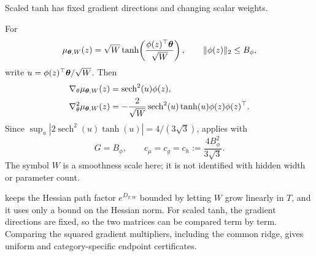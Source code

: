 Scaled tanh has fixed gradient directions and changing scalar weights.

\begin{remark}
For
\[
 \mu_{\boldsymbol{\theta},W}(z)=\sqrt W\tanh\!\left(
 \frac{\phi(z)^\top\boldsymbol{\theta}}{\sqrt W}\right),
 \qquad \|\phi(z)\|_2\le B_\phi,
\]
write $u=\phi(z)^\top\boldsymbol{\theta}/\sqrt W$.  Then
\begin{align*}
 \nabla_\theta\mu_{\boldsymbol{\theta},W}(z)
 &=\operatorname{sech}^2(u)\phi(z),\\
 \nabla_\theta^2\mu_{\boldsymbol{\theta},W}(z)
 &=-\frac{2}{\sqrt W}\operatorname{sech}^2(u)\tanh(u)
 \phi(z)\phi(z)^\top.
\end{align*}
Since
$\sup_u|2\operatorname{sech}^2(u)\tanh(u)|=4/(3\sqrt3)$,
 applies with
\[
 G=B_\phi,\qquad
 c_\mu=c_g=c_h:=\frac{4B_\phi^2}{3\sqrt3}.
\]
The symbol $W$ is a smoothness scale here; it is not identified with hidden
width or parameter count.
\end{remark}

 keeps the Hessian path factor
$e^{D_{T,W}}$ bounded by letting $W$ grow linearly in $T$, and it uses only a
bound on the Hessian norm. For scaled tanh, the gradient directions are fixed,
so the two matrices can be compared term by term. Comparing the
squared gradient multipliers, including the common ridge, gives uniform and
category-specific endpoint certificates.

